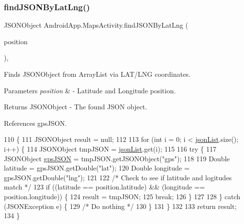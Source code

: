 \subsubsection{\texorpdfstring{find\+J\+S\+O\+N\+By\+Lat\+Lng()}{findJSONByLatLng()}}
{\footnotesize\ttfamily J\+S\+O\+N\+Object Android\+App.\+Maps\+Activity.\+find\+J\+S\+O\+N\+By\+Lat\+Lng (\begin{DoxyParamCaption}\item[{Lat\+Lng}]{position }\end{DoxyParamCaption})\hspace{0.3cm}{\ttfamily [inline]}, {\ttfamily [private]}}



Finds J\+S\+O\+N\+Object from Array\+List via L\+A\+T/\+L\+NG coordinates. 


\begin{DoxyParams}{Parameters}
{\em position} & -\/ Latitude and Longitude position. \\
\hline
\end{DoxyParams}
\begin{DoxyReturn}{Returns}
J\+S\+O\+N\+Object -\/ The found J\+S\+ON object. 
\end{DoxyReturn}


References gps\+J\+S\+ON.


\begin{DoxyCode}
110                                                          \{
111         JSONObject result = null;
112 
113         \textcolor{keywordflow}{for} (\textcolor{keywordtype}{int} i = 0; i < \hyperlink{class_android_app_1_1_maps_activity_a5ff2abfd342648b27a17551d5bd668ac}{jsonList}.size(); i++) \{
114             JSONObject tmpJSON = \hyperlink{class_android_app_1_1_maps_activity_a5ff2abfd342648b27a17551d5bd668ac}{jsonList}.get(i);
115 
116             \textcolor{keywordflow}{try} \{
117                 JSONObject \hyperlink{logging-device_8ino_a548727e041a5cd3db91bdbd0ccd71e30}{gpsJSON} = tmpJSON.getJSONObject(\textcolor{stringliteral}{"gps"});
118 
119                 Double latitude = gpsJSON.getDouble(\textcolor{stringliteral}{"lat"});
120                 Double longitude = gpsJSON.getDouble(\textcolor{stringliteral}{"lng"});
121 
122                 \textcolor{comment}{/* Check to see if latitude and logitudes match */}
123                 \textcolor{keywordflow}{if} ((latitude == position.latitude) && (longitude == position.longitude)) \{
124                     result = tmpJSON;
125                     \textcolor{keywordflow}{break};
126                 \}
127 
128             \} \textcolor{keywordflow}{catch} (JSONException e) \{
129                 \textcolor{comment}{/* Do nothing */}
130             \}
131         \}
132 
133         \textcolor{keywordflow}{return} result;
134     \}
\end{DoxyCode}
\mbox{\label{class_android_app_1_1_maps_activity_aea9b9fe75f1d70e3c902c8348823efd0}} 
